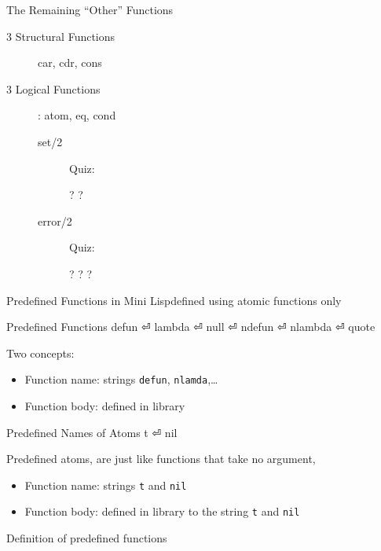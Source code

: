 \documentclass[fleqn]{beamer}
\begin{document}
\begin{frame}{The Remaining ``Other'' Functions}
\begin{description}
  \item[3 Structural Functions] car, cdr, cons
  \item[3 Logical Functions]: atom, eq, cond
    \begin{description}
      \item[set/2] Quiz:
        \begin{itemize}
          ?
          ?
        \end{itemize}
      \item[error/2] Quiz:
        \begin{itemize}
          ?
          ?
          ?
        \end{itemize}
    \end{description}
\end{description}
\end{frame}

\begin{frame}{Predefined Functions in Mini Lisp}{defined using atomic functions only}
\begin{block}{Predefined Functions}
  defun ⏎
  lambda ⏎
  null ⏎
  ndefun ⏎
  nlambda ⏎
  quote
\end{block}
Two concepts:
\begin{itemize}
  \item Function name: strings \texttt{defun}, \texttt{nlamda},…
  \item Function body: defined in library
\end{itemize}
\pause
\begin{block}{Predefined Names of Atoms}
  t ⏎
  nil
\end{block}
Predefined atoms, are just like functions that take no argument,
\begin{itemize}
  \item Function name: strings \texttt{t} and \texttt{nil}
  \item Function body: defined in library to the string \texttt{t} and \texttt{nil}
\end{itemize}
\end{frame}

\begin{frame}{Definition of predefined functions}
\begin{LTR}
  
\end{LTR}
\end{frame}
\end{document}
